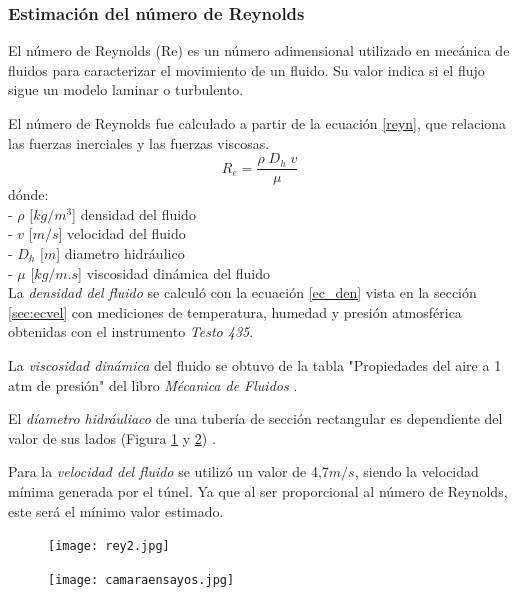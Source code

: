 \subsubsection{Estimación del número de Reynolds}
\begin{tcolorbox}[colback=blue!5!white,colframe=blue!75!black,title=Número de Reynolds]
	El número de Reynolds (Re) es un número adimensional utilizado en mecánica de fluidos para caracterizar el movimiento de un fluido. Su valor indica si el flujo sigue un modelo laminar o turbulento.
\end{tcolorbox}
El número de Reynolds fue calculado a partir de la ecuación \ref{reyn}, que relaciona las fuerzas inerciales y las fuerzas viscosas. 
\begin{equation}	
	R_e=\frac{\rho\;D_h\;v}\mu
	\label{reyn}
\end{equation}	
dónde:\\
- \textbf{$\rho$ } [$kg/m^{3}$] densidad del fluido \\
- \textbf{$v$ } [$m/s$] velocidad del fluido\\
- \textbf{$D_h$ } [$m$] diametro hidráulico\\
- \textbf{$\mu$ } [$kg/m.s$] viscosidad dinámica del fluido\\

La \textit{densidad del fluido} se calculó con la ecuación \ref{ec_den} vista en la sección \ref{sec:ecvel} con mediciones de temperatura, humedad y presión atmosférica obtenidas con el instrumento \textit{Testo 435}.

La \textit{viscosidad dinámica} del fluido se obtuvo de la tabla "Propiedades del aire a 1 atm de presión" { }del libro \textit{Mécanica de Fluidos} \cite{yunus2006mecanica}.

El \textit{díametro hidráuliaco} de una tubería de sección rectangular es dependiente del valor de sus lados (Figura \ref{fig:rey2} y \ref{fig:camens}) \cite{licci2020estudio}.

Para la \textit{velocidad del fluido} se utilizó un valor de 4,7$m/s$, siendo la velocidad mínima generada por el túnel. Ya que al ser proporcional al número de Reynolds, este será el mínimo valor estimado.

\begin{figure}[htb]
	\centering
	\texttt{[image: rey2.jpg]}
	\label{fig:rey2}
\end{figure}


\begin{figure}[htb]
	\centering
	\texttt{[image: camaraensayos.jpg]}
	\label{fig:camens}
\end{figure}

